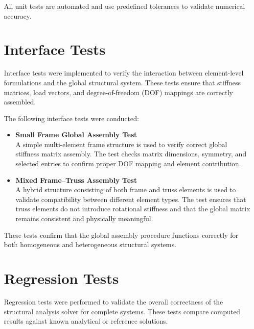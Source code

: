 All unit tests are automated and use predefined tolerances to validate numerical accuracy.

\section{Interface Tests}

Interface tests were implemented to verify the interaction between element-level formulations and the global structural system. These tests ensure that stiffness matrices, load vectors, and degree-of-freedom (DOF) mappings are correctly assembled.

The following interface tests were conducted:
\begin{itemize}
    \item \textbf{Small Frame Global Assembly Test} \\
    A simple multi-element frame structure is used to verify correct global stiffness matrix assembly. The test checks matrix dimensions, symmetry, and selected entries to confirm proper DOF mapping and element contribution.
    \item \textbf{Mixed Frame--Truss Assembly Test} \\
    A hybrid structure consisting of both frame and truss elements is used to validate compatibility between different element types. The test ensures that truss elements do not introduce rotational stiffness and that the global matrix remains consistent and physically meaningful.
\end{itemize}

These tests confirm that the global assembly procedure functions correctly for both homogeneous and heterogeneous structural systems.

\section{Regression Tests}

Regression tests were performed to validate the overall correctness of the structural analysis solver for complete systems. These tests compare computed results against known analytical or reference solutions.

